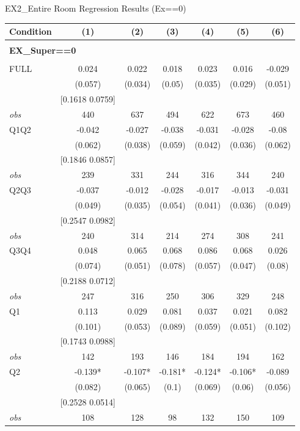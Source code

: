 \begin{table}[]
\TABLE
{EX2_Entire Room Regression Results (Ex==0) \label{ex2_result_detail2}}{\begin{tabular}{lcccccc}
\hline
Condition & (1) & (2) & (3) & (4) & (5) & (6) \\ \hline
\\ 
\multicolumn{5}{l}{\textbf{EX\_Super==0}} \\ 
\\ 
FULL & 0.024 & 0.022 & 0.018 & 0.023 & 0.016 & -0.029 \\ 
&(0.057)&(0.034) & (0.05)&(0.035)&(0.029)&(0.051)\\ 
& [0.1618 0.0759] & & & & & \\ 
\textit{obs} & 440 & 637 & 494 & 622 & 673 & 460 \\ 
Q1Q2 & -0.042 & -0.027 & -0.038 & -0.031 & -0.028 & -0.08 \\ 
&(0.062)&(0.038) & (0.059)&(0.042)&(0.036)&(0.062)\\ 
& [0.1846 0.0857] & & & & & \\ 
\textit{obs} & 239 & 331 & 244 & 316 & 344 & 240 \\ 
Q2Q3 & -0.037 & -0.012 & -0.028 & -0.017 & -0.013 & -0.031 \\ 
&(0.049)&(0.035) & (0.054)&(0.041)&(0.036)&(0.049)\\ 
& [0.2547 0.0982] & & & & & \\ 
\textit{obs} & 240 & 314 & 214 & 274 & 308 & 241 \\ 
Q3Q4 & 0.048 & 0.065 & 0.068 & 0.086 & 0.068 & 0.026 \\ 
&(0.074)&(0.051) & (0.078)&(0.057)&(0.047)&(0.08)\\ 
& [0.2188 0.0712] & & & & & \\ 
\textit{obs} & 247 & 316 & 250 & 306 & 329 & 248 \\ 
Q1 & 0.113 & 0.029 & 0.081 & 0.037 & 0.021 & 0.082 \\ 
&(0.101)&(0.053) & (0.089)&(0.059)&(0.051)&(0.102)\\ 
& [0.1743 0.0988] & & & & & \\ 
\textit{obs} & 142 & 193 & 146 & 184 & 194 & 162 \\ 
Q2 & -0.139* & -0.107* & -0.181* & -0.124* & -0.106* & -0.089 \\ 
&(0.082)&(0.065) & (0.1)&(0.069)&(0.06)&(0.056)\\ 
& [0.2528 0.0514] & & & & & \\ 
\textit{obs} & 108 & 128 & 98 & 132 & 150 & 109 \\ 

\end{tabular}}
\end{table}
